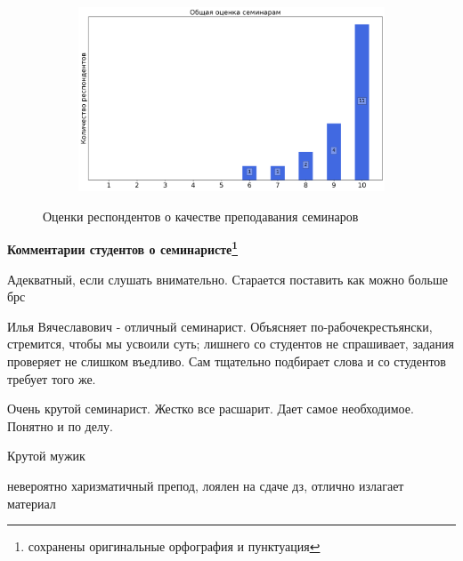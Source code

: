 \begin{figure}[H]
\begin{subfigure}[b]{0.45\textwidth}
			\end{subfigure}
			\begin{subfigure}[b]{0.45\textwidth}
				\centering
				\includegraphics[width=\textwidth]{images/1 course/Математический анализ/seminarists-marks-Каржеманов И.В.-3.png}
			\end{subfigure}	
			\caption{Оценки респондентов о качестве преподавания семинаров}
		\end{figure}

		\textbf{Комментарии студентов о семинаристе\protect\footnote{сохранены оригинальные орфография и пунктуация}}
			\begin{commentbox} 
				Адекватный, если слушать внимательно. Старается поставить как можно больше брс 
			\end{commentbox} 
		
			\begin{commentbox} 
				Илья Вячеславович - отличный семинарист. Объясняет по-рабочекрестьянски, стремится, чтобы мы усвоили суть; лишнего со студентов не спрашивает, задания проверяет не слишком въедливо. Сам тщательно подбирает слова и со студентов требует того же. 
			\end{commentbox} 
		
			\begin{commentbox} 
				Очень крутой семинарист. Жестко все расшарит. Дает самое необходимое. Понятно и по делу. 
			\end{commentbox} 
		
			\begin{commentbox} 
				Крутой мужик  
			\end{commentbox} 
		
			\begin{commentbox} 
				невероятно харизматичный препод, лоялен на сдаче дз, отлично излагает материал 
			\end{commentbox}


